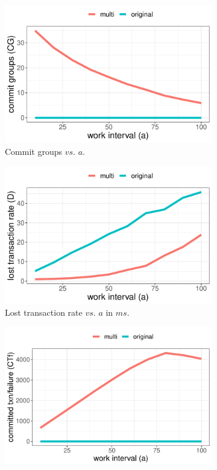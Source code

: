 \begin{figure}
\centering
\begin{subfigure}{.32\textwidth}
    \centering
    \includegraphics[width=.95\linewidth]{figures/fig-6a.pdf}  
    \caption{Commit groups $vs.$ $a$.}
    \label{fig:6a}
\end{subfigure}
\begin{subfigure}{.32\textwidth}
    \centering
    \includegraphics[width=.95\linewidth]{figures/fig-6b.pdf}  
    \caption{Lost transaction rate $vs.$ $a$ in $ms.$}
    \label{fig:6b}
\end{subfigure}
\begin{subfigure}{.32\textwidth}
    \centering
    \includegraphics[width=.95\linewidth]{figures/fig-6c.pdf}  

\end{subfigure}
\end{figure}
